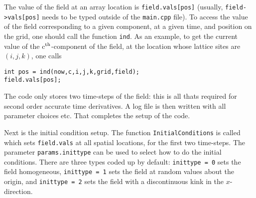 \documentclass[amsmath,amssymb,12pt, eqsecnum]{revtex4}
\newcommand\codeRed[1]{\textcolor[rgb]{1,0,0}{{\tt #1}}}
\newcommand\codeBlue[1]{\textcolor[rgb]{0,0,1}{{\tt #1}}}
\begin{document}
The value of the field at an array location is {\tt field.vals[pos]} (usually, {\tt field->vals[pos]} needs to be typed outside of the \codeRed{main.cpp} file). To access the value of the field corresponding to a given component, at a given time, and position on the grid, one should call the function {\tt ind}. As an example, to get the current value of the c${}^{\textrm{th}}$-component of the field, at the location whose lattice sites are $(i,j,k)$, one calls
\begin{verbatim}
int pos = ind(now,c,i,j,k,grid,field);
field.vals[pos];
\end{verbatim}
The code only stores two time-steps of the field: this is all thats required for second order accurate time derivatives.
A log file is then written with all parameter choices etc. That completes the setup of the code. 

Next is the initial condition setup. The function \codeBlue{InitialConditions} is called which sets {\tt field.vals} at all spatial locations, for the first two time-steps. The parameter {\tt params.inittype} can be used to select how to do the initial conditions. There are three types coded up by default: {\tt inittype = 0} sets the field homogeneous, {\tt inittype = 1} sets the field at random values about the origin, and {\tt inittype = 2} sets the field with a discontinuous kink in the $x$-direction.
\end{document}
